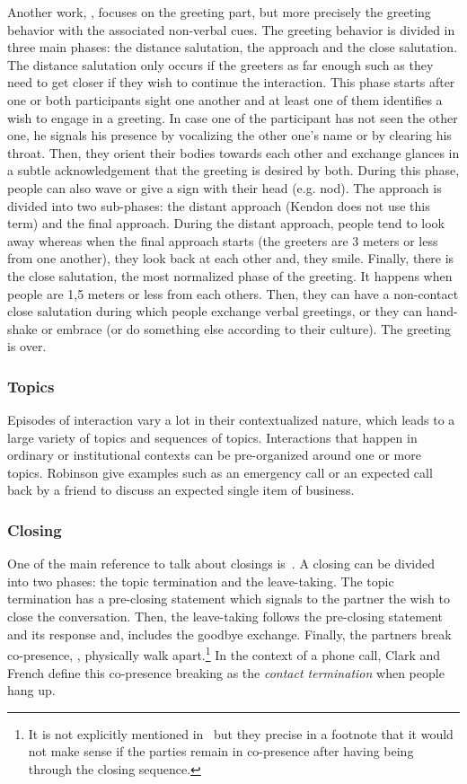 \documentclass[a4paper,11pt,twoside]{StyleThese}
\begin{document}
Another work, \cite{kendon_1990_conducting}, focuses on the greeting part, but more precisely the greeting behavior with the associated non-verbal cues. The greeting behavior is divided in three main phases: the distance salutation, the approach and the close salutation. 
The distance salutation only occurs if the greeters as far enough such as they need to get closer if they wish to continue the interaction. This phase starts after one or both participants sight one another and at least one of them identifies a wish to engage in a greeting. In case one of the participant has not seen the other one, he signals his presence by vocalizing the other one’s name or by clearing his throat. Then, they orient their bodies towards each other and exchange glances in a subtle acknowledgement that the greeting is desired by both. During this phase, people can also wave or give a sign with their head (e.g. nod).
The approach is divided into two sub-phases: the distant approach (Kendon does not use this term) and the final approach. During the distant approach, people tend to look away whereas when the final approach starts (the greeters are 3 meters or less from one another), they look back at each other and, they smile.
Finally, there is the close salutation, the most normalized phase of the greeting. It happens when people are 1,5 meters or less from each others. Then, they can have a non-contact close salutation during which people exchange verbal greetings, or they can hand-shake or embrace (or do something else according to their culture). The greeting is over.
\subsubsection{Topics}
Episodes of interaction vary a lot in their contextualized nature, which leads to a large variety of topics and sequences of topics. Interactions that happen in ordinary or institutional contexts can be pre-organized around one or more topics. Robinson give examples such as an emergency call or an expected call back by a friend to discuss an expected single item of business.

\subsubsection{Closing}
One of the main reference to talk about closings is~\cite{schegloff_1973_opening}. A closing can be divided into two phases: the topic termination and the leave-taking.
The topic termination has a pre-closing statement which signals to the partner the wish to close the conversation. Then, the leave-taking follows the pre-closing statement and its response and, includes the goodbye exchange. Finally, the partners break co-presence, \ie, physically walk apart.\footnote{It is not explicitly mentioned in~\cite{schegloff_1973_opening}  but they precise in a footnote that it would not make sense if the parties remain in co-presence after having being through the closing sequence.} In the context of a phone call, Clark and French define this co-presence breaking as the \textit{contact termination} when people hang up.
\end{document}
